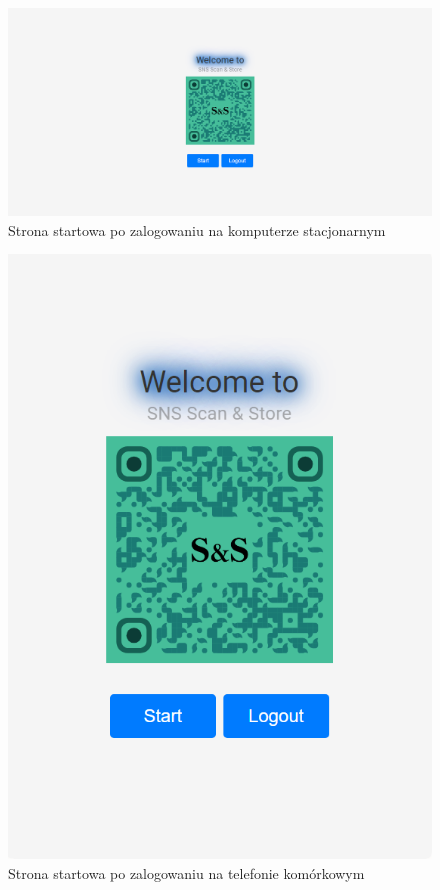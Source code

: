 \documentclass[../main.tex]{subfiles}
\begin{document}
            \begin{figure}[H]
                \centering
                \includegraphics[width=\getImageWidth]{images/app-desktop/app-starting-page-after-login-desktop.png}
                \caption{Strona startowa po zalogowaniu na komputerze stacjonarnym}
                \label{fig:app-starting-page-after-login-desktop}
            \end{figure}
            \begin{figure}[H]
                \centering
                \includegraphics[height=\getImageHeight]{images/app-mobile/app-starting-page-after-login-mobile.png}
                \caption{Strona startowa po zalogowaniu na telefonie komórkowym}
                \label{fig:app-starting-page-after-login-mobile}
            \end{figure}
\end{document}
